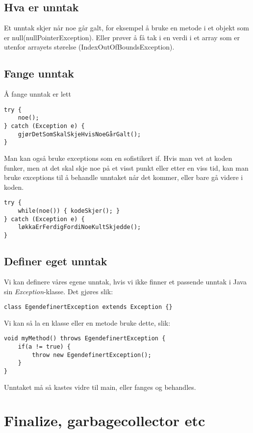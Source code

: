 \documentclass[11pt]{article}
\begin{document}
\subsection{Hva er unntak}
\label{sec-16_1}

Et unntak skjer når noe går galt, for eksempel å bruke en metode i et objekt
som er null(nullPointerException). Eller prøver å få tak i en verdi i et array
som er utenfor arrayets størelse (IndexOutOfBoundsException).
\subsection{Fange unntak}
\label{sec-16_2}

Å fange unntak er lett

\begin{verbatim}
try { 
    noe();
} catch (Exception e) {
    gjørDetSomSkalSkjeHvisNoeGårGalt();
}
\end{verbatim}

Man kan også bruke exceptions som en sofistikert if. Hvis man vet at koden funker, men at det
skal skje noe på et visst punkt eller etter en viss tid, kan man bruke exceptions til å
behandle unntaket når det kommer, eller bare gå videre i koden.

\begin{verbatim}
try { 
    while(noe()) { kodeSkjer(); }
} catch (Exception e) {
    løkkaErFerdigFordiNoeKultSkjedde();
}
\end{verbatim}
\subsection{Definer eget unntak}
\label{sec-16_3}

Vi kan definere våres egene unntak, hvis vi ikke finner et passende
unntak i Java sin \emph{Exception}-klasse. Det gjøres slik:

\begin{verbatim}
class EgendefinertException extends Exception {}
\end{verbatim}

Vi kan så la en klasse eller en metode bruke dette, slik:

\begin{verbatim}
void myMethod() throws EgendefinertException {
    if(a != true) {
        throw new EgendefinertException();
    }
}
\end{verbatim}

Unntaket må så kastes vidre til main, eller fanges og behandles. 
\section{Finalize, garbagecollector etc}
\label{sec-17}
\end{document}
